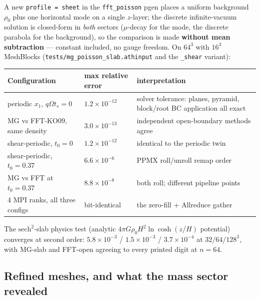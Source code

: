 \documentclass[11pt]{article}
\newcommand{\code}[1]{\texttt{#1}}
\newcommand{\file}[1]{\texttt{#1}}
\newcommand{\Om}{\Omega}
\begin{document}
A new \code{profile = sheet} in the \code{fft\_poisson} pgen places a uniform
background $\rho_0$ plus one horizontal mode on a single $z$-layer; the discrete
infinite-vacuum solution is closed-form in \emph{both} sectors ($\mu$-decay for
the mode, the discrete parabola for the background), so the comparison is made
\textbf{without mean subtraction} --- constant included, no gauge freedom. On
$64^3$ with $16^3$ MeshBlocks (\file{tests/mg\_poisson\_slab.athinput} and the
\code{\_shear} variant):

\begin{center}
\small
\begin{tabular}{@{}llp{5.6cm}@{}}
\toprule
Configuration & max relative error & interpretation \\
\midrule
periodic $x_1$, $q\Om t_s{=}0$ & $1.2\times10^{-12}$ & solver tolerance: planes,
pyramid, block/root BC application all exact \\
MG vs FFT-KO09, same density & $3.0\times10^{-13}$ & independent open-boundary
methods agree \\
shear-periodic, $t_0{=}0$ & $1.2\times10^{-12}$ & identical to the periodic twin \\
shear-periodic, $t_0{=}0.37$ & $6.6\times10^{-6}$ & PPMX roll/unroll remap order \\
\quad MG vs FFT at $t_0{=}0.37$ & $8.8\times10^{-8}$ & both roll; different
pipeline points \\
4 MPI ranks, all three configs & bit-identical & the zero-fill + Allreduce gather \\
\bottomrule
\end{tabular}
\end{center}

\noindent The $\mathrm{sech}^2$-slab physics test (analytic
$4\pi G\rho_0H^2\ln\cosh(z/H)$ potential) converges at second order:
$5.8\times10^{-3}$ / $1.5\times10^{-3}$ / $3.7\times10^{-4}$ at $32/64/128^3$,
with MG-slab and FFT-open agreeing to every printed digit at $n=64$.

\subsection{Refined meshes, and what the mass sector revealed}
\label{sec:p3_smr}
\end{document}
